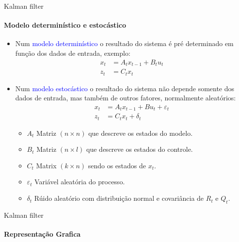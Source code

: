 \documentclass{beamer}
\begin{document}
\begin{frame}{Kalman filter}
    \framesubtitle{Modelo determinístico e estocástico}
    \begin{itemize}
        \item Num \textcolor{blue}{modelo determinístico} o resultado do sistema é pré determinado em função dos dados de entrada, exemplo:
        \begin{align*} 
            x_t &= A_t x_{t-1} + B_t u_t\\ 
            z_t &= C_t x_t
        \end{align*}

        \item Num \textcolor{blue}{modelo estocástico} o resultado do sistema não depende somente dos dados de entrada, mas também de outros fatores, normalmente
        aleatórios:
        \begin{align} 
            x_t &= A_t x_{t-1} + B u_t +  \varepsilon_t\\ 
            z_t &= C_t x_t + \delta_t
        \end{align}

        \begin{itemize}
            \item $A_t$ Matriz $(n \times n)$ que descreve os estados do modelo.
            \item $B_t$ Matriz $(n \times l)$ que descreve os estados do controle.
            \item $C_t$ Matrix $(k\times n)$ sendo os estados de $x_t$.
            \item $ \varepsilon_t$ Variável aleatória do processo.
            \item $\delta_t$ Rúido aleatório com distribuição normal e covariância de $R_t$ e $Q_t$.
        \end{itemize}
    \end{itemize}
\end{frame}


\begin{frame}{Kalman filter}
    \framesubtitle{Representação Grafica}
    
\end{frame}
\end{document}
